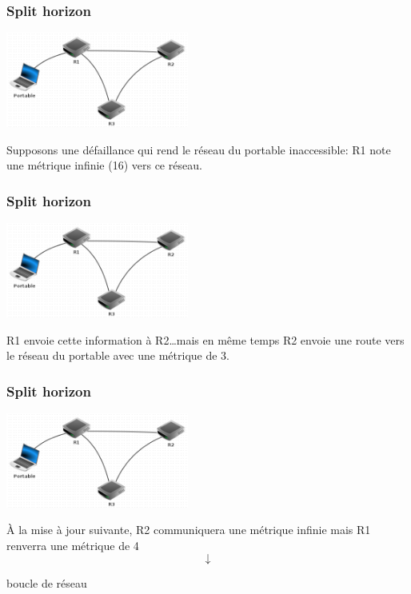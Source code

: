 \documentclass[svgnames,11pt]{beamer}
\begin{document}
\begin{frame}
    \frametitle{Split horizon}

    \begin{center}
        \centering
        \includegraphics[width=6cm]{ressources/split.png}
        \label{IMG}
        \end{center}
Supposons une défaillance qui rend le réseau du portable inaccessible: R1 note une métrique infinie (16) vers ce réseau.
\end{frame}
\begin{frame}
    \frametitle{Split horizon}

    \begin{center}
        \centering
        \includegraphics[width=6cm]{ressources/split.png}
        \label{IMG}
        \end{center}
R1 envoie cette information à R2\dots mais en même temps R2 envoie une route vers le réseau du portable avec une métrique de 3.
\end{frame}

\begin{frame}
    \frametitle{Split horizon}

    \begin{center}
        \centering
        \includegraphics[width=6cm]{ressources/split.png}
        \label{IMG}
        \end{center}
À la mise à jour suivante, R2 communiquera une métrique infinie mais R1 renverra une métrique de 4 $$\downarrow$$ \begin{center}
    boucle de réseau
\end{center}
\end{frame}
\end{document}

